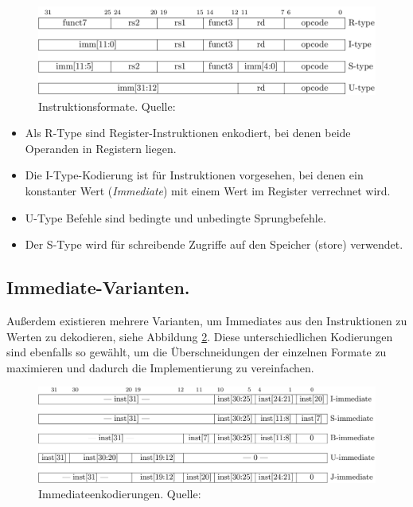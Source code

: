 \begin{figure} [ht]
  \centering
  \includegraphics[width=\textwidth]{Figures/instruction_formats}
  \caption{Instruktionsformate. Quelle: \citep[S. 11]{RISC}}
  \label{fig:instr_types}
\end{figure}

\begin{itemize}  
\item Als R-Type sind Register-Instruktionen enkodiert, bei denen beide Operanden in Registern liegen. 
\item Die I-Type-Kodierung ist für Instruktionen vorgesehen, bei denen ein konstanter Wert (\textit{Immediate}) mit einem Wert im Register verrechnet wird.
\item U-Type Befehle sind bedingte und unbedingte Sprungbefehle.
\item Der S-Type wird für schreibende Zugriffe auf den Speicher (store) verwendet. 
\end{itemize}

\subsection{Immediate-Varianten.} Außerdem existieren mehrere Varianten, um Immediates aus den Instruktionen zu Werten zu dekodieren, siehe Abbildung \ref{fig:immediates}. Diese unterschiedlichen Kodierungen sind ebenfalls so gewählt, um die Überschneidungen der einzelnen Formate zu maximieren und dadurch die Implementierung zu vereinfachen. \cite[S. 11f.]{RISC} 

\begin{figure} [ht]
  \centering
  \includegraphics[width=\textwidth]{Figures/immediates}
  \caption{Immediateenkodierungen. Quelle: \citep[S. 12]{RISC}}
  \label{fig:immediates}
\end{figure}


